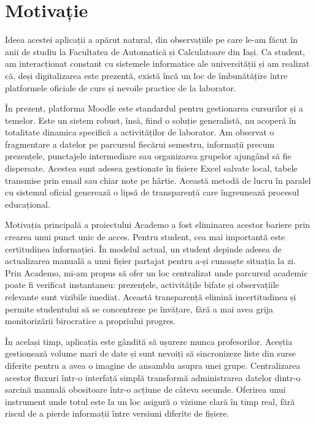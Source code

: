 \chapter*{Motivație}

Ideea acestei aplicații a apărut natural, din observațiile pe care le-am făcut în anii de studiu
la Facultatea de Automatică și Calculatoare din Iași. Ca student, am interacționat constant cu
sistemele informatice ale universității și am realizat că, deși digitalizarea este prezentă,
există încă un loc de îmbunătățire între platformele oficiale de curs și nevoile practice de la laborator.

În prezent, platforma Moodle este standardul pentru gestionarea cursurilor și a temelor. Este un
sistem robust, însă, fiind o soluție generalistă, nu acoperă în totalitate dinamica specifică a
activităților de laborator. Am observat o fragmentare a datelor pe parcursul fiecărui semestru,
informații precum prezențele, punctajele intermediare sau organizarea grupelor ajungând să fie dispersate.
Acestea sunt adesea gestionate în fișiere Excel salvate local, tabele transmise prin email sau chiar note
pe hârtie. Această metodă de lucru în paralel cu sistemul oficial generează o lipsă de transparență care
îngreunează procesul educațional.

Motivația principală a proiectului Academo a fost eliminarea acestor bariere prin crearea unui punct unic
de acces. Pentru student, cea mai importantă este certitudinea informației. În modelul actual, un student
depinde adesea de actualizarea manuală a unui fișier partajat pentru a-și cunoaște situația la zi.
Prin Academo, mi-am propus să ofer un loc centralizat unde parcursul academic poate fi verificat instantaneu:
prezențele, activitățile bifate și observațiile relevante sunt vizibile imediat. Această transparență
elimină incertitudinea și permite studentului să se concentreze pe învățare, fără a mai avea grija monitorizării
birocratice a propriului progres.

În același timp, aplicația este gândită să ușureze munca profesorilor. Aceștia gestionează
volume mari de date și sunt nevoiți să sincronizeze liste din surse diferite pentru a avea o
imagine de ansamblu asupra unei grupe. Centralizarea acestor fluxuri într-o interfață simplă transformă
administrarea datelor dintr-o sarcină manuală obositoare într-o acțiune de câteva secunde. Oferirea unui
instrument unde totul este la un loc asigură o viziune clară în timp real, fără riscul de a pierde informații între versiuni diferite de fișiere.

